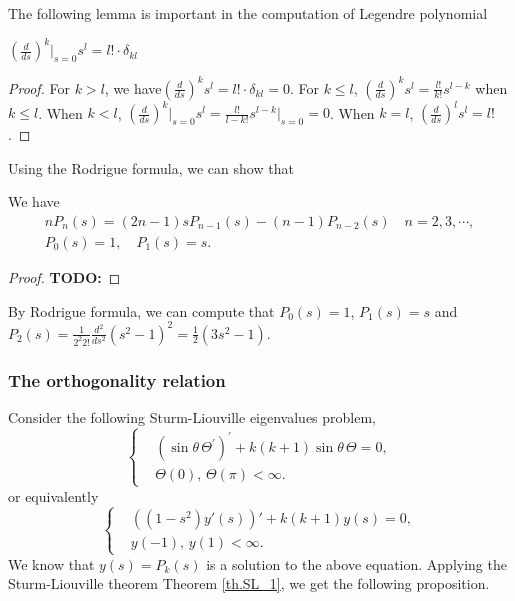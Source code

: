 The following lemma is important in the computation of Legendre polynomial
\begin{lemma}[]
    $\left(\frac{d}{d s}\right)^k\Big|_{s = 0} s^l = l!\cdot \delta_{kl}$    
\end{lemma}
\begin{proof}
    For $k > l$, we have$\left(\frac{d}{d s}\right)^k s^l = l!\cdot \delta_{kl} = 0$. For $k\le l$, $\left(\frac{d}{d s}\right)^k s^l = \frac{l!}{k!}s^{l-k}$ when $k \le l$. When $k < l$, $\left(\frac{d}{d s}\right)^k\Big|_{s = 0} s^l = \frac{l!}{{l-k}!}s^{l-k}|_{s = 0} = 0$. When $k = l$, $\left(\frac{d}{d s}\right)^l s^l = l!$.
\end{proof}


Using the Rodrigue formula, we can show that 
\begin{proposition} We have
\begin{equation}\label{eq.Legendre_recursion}
\begin{gathered}
    n P_n(s)=(2 n-1) s P_{n-1}(s)-(n-1) P_{n-2}(s) \quad n=2,3, \cdots, 
    \\ 
    P_0(s)=1, \quad P_1(s)=s .
\end{gathered}
\end{equation}
\end{proposition}
\begin{proof}
    \textbf{TODO: }
\end{proof}

\begin{example}[] By Rodrigue formula, we can compute that $P_0(s) = 1$, $P_1(s) = s$ and $P_2(s) = \frac{1}{2^2 2!}\frac{d^2}{ds^2} (s^2 - 1)^2 = \frac{1}{2}(3s^2 - 1)$.
\end{example}


\subsubsection{The orthogonality relation}
Consider the following Sturm-Liouville eigenvalues problem,
\begin{equation}\label{eq.Legendre_SL_problem}
\left\{
\begin{aligned}
    &(\sin\theta\,\Theta^{\prime})^{\prime}+k(k+1) \sin\theta\,\Theta=0, 
    \\
    &\Theta(0),\, \Theta(\pi)  < \infty.
\end{aligned}
\right.
\end{equation}
or equivalently
\begin{equation}\label{eq.Legendre_SL_problem'}
\left\{
\begin{aligned}
    &((1-s^2)y'(s))' + k(k+1) y(s) = 0, 
    \\
    &y(-1),\, y(1)  < \infty.
\end{aligned}
\right.
\end{equation}
We know that $y(s) = P_k(s)$ is a solution to the above equation. Applying the Sturm-Liouville theorem Theorem \ref{th.SL_1}, we get the following proposition.

